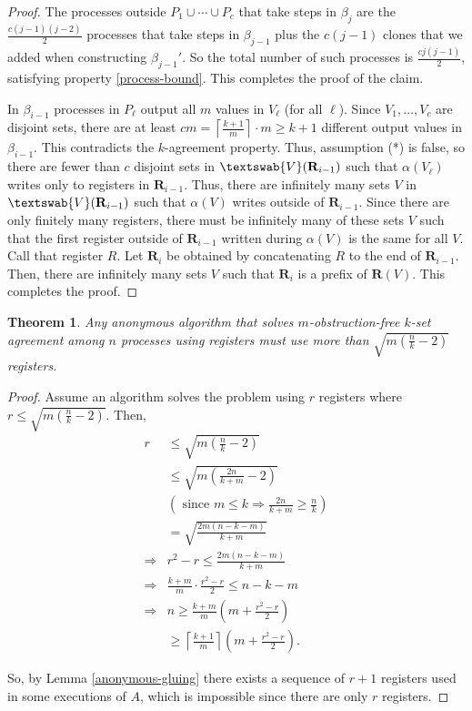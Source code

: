 \documentclass[11pt]{article}
\newtheorem{theorem}{Theorem}
\newcommand{\gV}{\textswab{V}}
\newcommand{\bR}{\mathbf{R}}
\newcommand{\ceil}[1]{\left\lceil #1 \right\rceil}
\begin{document}
\begin{proof}
The processes outside $P_1\cup \cdots \cup P_c$ that take steps in $\beta_j$
are the $\frac{c(j-1)(j-2)}{2}$ processes that take steps in $\beta_{j-1}$
plus the $c(j-1)$ clones that we added when constructing $\beta_{j-1}'$.
So the total number of such processes is $\frac{cj(j-1)}{2}$, satisfying property \ref{process-bound}.
This completes the proof of the claim.

\medskip

In $\beta_{i-1}$ processes in $P_\ell$ output all $m$ values in $V_\ell$ (for all $\ell$).  Since $V_1,\ldots,V_c$ are disjoint sets, there are at least $cm = \ceil{\frac{k+1}{m}}\cdot m \geq k+1$ different output values in $\beta_{i-1}$.
This contradicts the $k$-agreement property.
Thus, assumption (*) is false, so
there are fewer than $c$ disjoint sets in $\gV(\bR_{i-1})$ such that $\alpha(V_\ell)$ writes only to registers in $\bR_{i-1}$.
Thus, there are infinitely many sets $V$ in $\gV(\bR_{i-1})$ such that $\alpha(V)$ writes outside of $\bR_{i-1}$.
Since there are only finitely many registers, there must be infinitely many of these sets $V$ such that the first register
outside of $\bR_{i-1}$ written during $\alpha(V)$ is the same for all $V$.  Call that register $R$.  Let $\bR_{i}$
be obtained by concatenating $R$ to the end of $\bR_{i-1}$.  Then, there are infinitely many sets $V$ such that $\bR_i$ is a prefix of
$\bR(V)$.
This completes the proof.
\end{proof}

\begin{theorem}
\label{m-conc-lower-thm}
Any anonymous algorithm that solves $m$-obstruction-free $k$-set agreement among $n$ processes using registers must use more than $\sqrt{m(\frac{n}{k}-2)}$ registers.
\end{theorem}

\begin{proof}
Assume an algorithm solves the problem using $r$ registers where $r\leq \sqrt{m(\frac{n}{k}-2)}$.
Then,
\begin{eqnarray*}
r & \leq  \sqrt{m\left(\frac{n}{k}-2\right)}\\
& \leq  \sqrt{m\left(\frac{2n}{k+m}-2\right)} \\
&(\mbox{ since }m\leq k \Rightarrow 
\frac{2n}{k+m}\geq\frac{n}{k} )\\
& = \sqrt{\frac{2m(n-k-m)}{k+m}}\\
\Rightarrow &  r^2-r \leq  \frac{2m(n-k-m)}{k+m}\\
\Rightarrow & \frac{k+m}{m}\cdot\frac{r^2-r}{2} \leq n-k-m\\
\Rightarrow & n  \geq \frac{k+m}{m}\left(m+\frac{r^2-r}{2}\right)\\
&\geq  \ceil{\frac{k+1}{m}}\left(m+\frac{r^2-r}{2}\right).
\end{eqnarray*}
 
So, by Lemma \ref{anonymous-gluing} there exists a sequence of $r+1$ registers used in some executions of $A$, 
which is impossible since there are only $r$ registers.
\end{proof}
\end{document}
